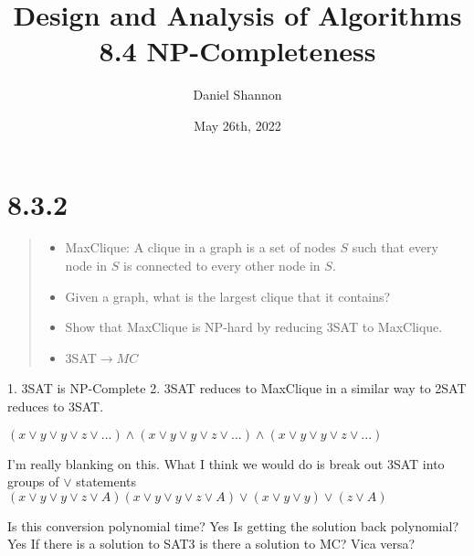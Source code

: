 \documentclass[12pt, letterpaper, twoside]{article}
\title{%
Design and Analysis of Algorithms\\
\large 8.4 NP-Completeness
}
\author{Daniel Shannon}
\date{May 26th, 2022}
\begin{document}
\begin{titlepage}
\maketitle
\end{titlepage}

\section*{8.3.2}
\begin{quote}
\begin{itemize}
    \item MaxClique: A clique in a graph is a set of nodes $S$ such that every node in $S$ is connected to every other node in $S$.
    \item Given a graph, what is the largest clique that it contains?
    \item Show that MaxClique is NP-hard by reducing 3SAT to MaxClique.
    \item 3SAT$\rightarrow{MC}$
\end{itemize}

\end{quote}

1. 3SAT is NP-Complete
2. 3SAT reduces to MaxClique in a similar way to 2SAT reduces to 3SAT.

$(x\lor{y}\lor{y}\lor{z}\lor{...})\land{(x\lor{y}\lor{y}\lor{z}\lor{...})}\land{(x\lor{y}\lor{y}\lor{z}\lor{...})}$

I'm really blanking on this. What I think we would do is break out
3SAT into groups of $\lor$ statements $(x\lor{y}\lor{y}\lor{z}\lor{A})(x\lor{y}\lor{y}\lor{z}\lor{A})\lor{(x\lor{y}\lor{y})}\lor{({z}\lor{A})}$


Is this conversion polynomial time? Yes
Is getting the solution back polynomial? Yes
If there is a solution to SAT3 is there a solution to MC?
Vica versa?
\end{document}
